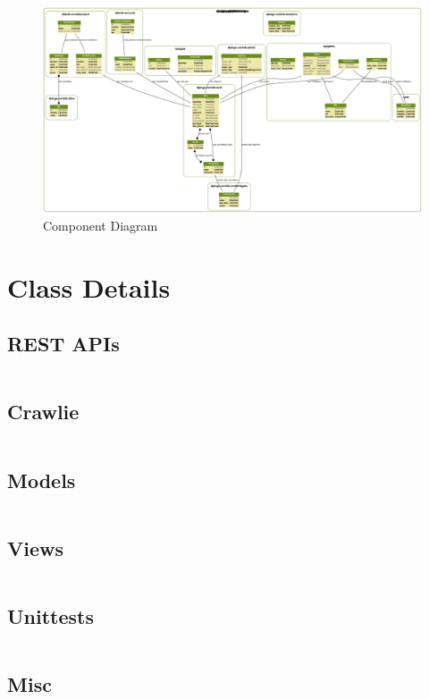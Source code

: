     \begin{figure}[h]
        \includegraphics[angle=90,height=\textheight]{files/spyglass.png}
        \caption{Component Diagram}
    \end{figure}

\chapter{Class Details}
    \section{REST APIs}
    \inputminted[linenos,fontsize=\scriptsize,frame=leftline]{text}{files/api}
    \section{Crawlie}
    \inputminted[linenos,fontsize=\scriptsize,frame=leftline]{text}{files/crawlie}
    \section{Models}
    \inputminted[linenos,fontsize=\scriptsize,frame=leftline]{text}{files/models}
    \section{Views}
    \inputminted[linenos,fontsize=\scriptsize,frame=leftline]{text}{files/views}
    \section{Unittests}
    \inputminted[linenos,fontsize=\scriptsize,frame=leftline]{text}{files/unittests}
    \section{Misc}
    \inputminted[linenos,fontsize=\scriptsize,frame=leftline]{text}{files/tags}

